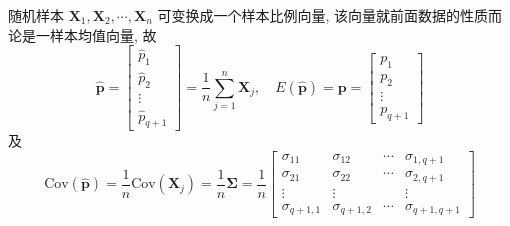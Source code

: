 随机样本 $\mathbf{X}_1,\mathbf{X}_2,\cdots,\mathbf{X}_n$ 可变换成一个样本比例向量, 该向量就前面数据的性质而论是一样本均值向量, 故
\[
\hat{\mathbf{p}}=\begin{bmatrix}\hat{p}_1\\\hat{p}_2\\\vdots\\\hat{p}_{q+1}\end{bmatrix}
=\frac{1}{n}\sum_{j=1}^{n}\mathbf{X}_j, \quad
E(\hat{\mathbf{p}})=\mathbf{p}=\begin{bmatrix}p_1\\p_2\\\vdots\\p_{q+1}\end{bmatrix}
\]
及
\[
\mathrm{Cov}(\hat{\mathbf{p}})=\frac{1}{n}\mathrm{Cov}(\mathbf{X}_j)=\frac{1}{n}\boldsymbol{\Sigma}
=\frac{1}{n}\begin{bmatrix}
\sigma_{11}&\sigma_{12}&\cdots&\sigma_{1,q+1}\\
\sigma_{21}&\sigma_{22}&\cdots&\sigma_{2,q+1}\\
\vdots&\vdots&&\vdots\\
\sigma_{q+1,1}&\sigma_{q+1,2}&\cdots&\sigma_{q+1,q+1}
\end{bmatrix}
\]
